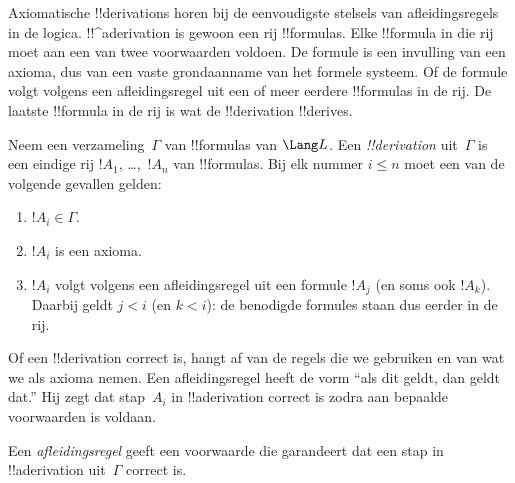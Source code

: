 \documentclass[openany]{memoir}
\begin{document}

\begin{explain}
  Axiomatische !!{derivation}s horen bij de eenvoudigste stelsels van
  afleidingsregels in de logica. !!^a{derivation} is gewoon een rij
  !!{formula}s. Elke !!{formula} in die rij moet aan een van twee
  voorwaarden voldoen. De formule is een invulling van een axioma, dus
  van een vaste grondaanname van het formele systeem. Of de formule
  volgt volgens een afleidingsregel uit een of meer eerdere
  !!{formula}s in de rij. De laatste !!{formula} in de rij is wat de
  !!{derivation} !!{derive}s.
\end{explain}

\begin{defn}[!!^{derivability}]
Neem een verzameling~$\Gamma$ van !!{formula}s van $\Lang L$. Een
\emph{!!{derivation}} uit~$\Gamma$ is een eindige rij $!A_1$,
\dots,~$!A_n$ van !!{formula}s. Bij elk nummer $i \le n$ moet een van
de volgende gevallen gelden:
\begin{enumerate}
\item $!A_i \in \Gamma$.
\item $!A_i$ is een axioma.
\item $!A_i$ volgt volgens een afleidingsregel uit een formule $!A_j$
  (en soms ook $!A_k$). Daarbij geldt $j < i$ (en $k < i$): de
  benodigde formules staan dus eerder in de rij.
\end{enumerate}
\end{defn}

Of een !!{derivation} correct is, hangt af van de regels die we
gebruiken en van wat we als axioma nemen. Een afleidingsregel heeft de
vorm ``als dit geldt, dan geldt dat.'' Hij zegt dat stap~$A_i$ in
!!a{derivation} correct is zodra aan bepaalde voorwaarden is voldaan.

\begin{defn}[Afleidingsregel]
Een \emph{afleidingsregel} geeft een voorwaarde die garandeert dat een
stap in !!a{derivation} uit~$\Gamma$ correct is.
\end{defn}
\end{document}
